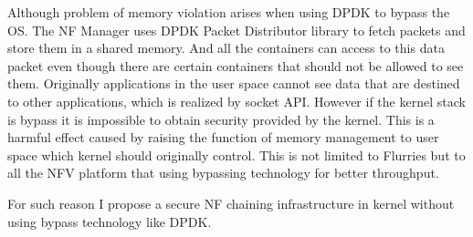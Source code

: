 Although problem of memory violation arises when using DPDK to bypass the OS. The NF Manager uses DPDK Packet Distributor library to fetch packets and store them in a shared memory. And all the containers can access to this data packet even though there are certain containers that should not be allowed to see them. Originally applications in the user space cannot see data that are destined to other applications, which is realized by socket API. However if the kernel stack is bypass it is impossible to obtain security provided by the kernel. This is a harmful effect caused by raising the function of memory management to user space which kernel should originally control. This is not limited to Flurries but to all the NFV platform that using bypassing technology for better throughput. 

For such reason I propose a secure NF chaining infrastructure in kernel without using bypass technology like DPDK. 






